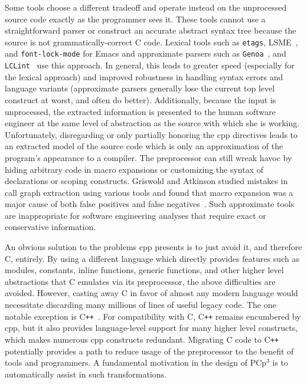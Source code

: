 \documentclass{article}
\newcommand{\pcp}{\mbox{\textsf{PCp}$^3$}}
\newcommand{\Cpp}{\mbox{\textsf{cpp}}}
\newcommand{\CPP}{\mbox{C\texttt{++}}}
\newcommand{\C}{\mbox{C}}
\begin{document}
Some tools choose a different tradeoff and operate instead on the
unprocessed source code exactly as the programmer sees it.  These tools
cannot use a straightforward parser or construct an accurate abstract
syntax tree because the source is not grammatically-correct \C{} code.
Lexical tools such as \texttt{etags}, LSME~\cite{Murphy96}, and
\texttt{font-lock-mode} for Emacs and approximate parsers such as
\texttt{Genoa}~\cite{Devanbu92}, and \texttt{LCLint}~\cite{LCLint}
use this approach.  In general, this leads to greater speed (especially
for the lexical approach) and improved robustness in handling syntax errors and
language variants (approximate parsers generally lose the current top
level construct at worst, and often do better). Additionally, because
the input is unprocessed, the extracted information is presented to the
human software engineer at the same level of abstraction as the source
with which she is working.  Unfortunately, disregarding or only
partially honoring the \Cpp{} directives leads to an extracted model of
the source code which is only an approximation of the program's
appearance to a compiler.  The preprocessor can still wreak havoc by
hiding arbitrary code in macro expansions or customizing the syntax of
declarations or scoping constructs.  Griswold and Atkinson studied
mistakes in call graph extraction using various tools and found that
macro expansion was a major cause of both false positives and false
negatives~\cite{Griswold96}.  Such approximate tools are inappropriate
for software engineering analyses that require exact or conservative
information.

An obvious solution to the problems \Cpp{} presents is to just avoid it,
and therefore \C{}, entirely.  By using a different language which
directly provides features such as modules, constants, inline functions,
generic functions, and other higher level abstractions that \C{}
emulates via its preprocessor, the above difficulties are avoided.
However, casting away \C{} in favor of almost any modern language would necessitate
discarding many millions of lines of useful legacy code.  The one notable
exception is \CPP{}~\cite{CD2DraftStandard}. For compatibility with
\C{}, \CPP{} remains encumbered by \Cpp{}, but it also provides
language-level support for many higher level constructs, which makes
numerous \Cpp{} constructs redundant.
Migrating \C{} code to \CPP{} potentially provides a path to reduce
usage of the preprocessor to the benefit of tools and programmers.  A
fundamental motivation in the design of \pcp{} is to automatically assist
in such transformations.
\end{document}
